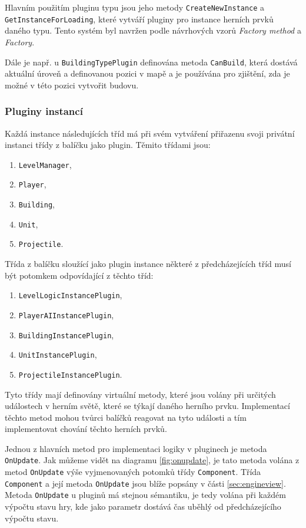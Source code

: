 Hlavním použitím pluginu typu jsou jeho metody \texttt{CreateNewInstance} a \texttt{GetInstanceForLoading}, které vytváří pluginy pro instance herních prvků daného typu. Tento systém byl navržen podle návrhových vzorů \textit{Factory method} a \textit{Factory}.

Dále je např. u \texttt{BuildingTypePlugin} definována metoda \texttt{CanBuild}, která dostává aktuální úroveň a definovanou pozici v mapě a je používána pro zjištění, zda je možné v této pozici vytvořit budovu.

\subsubsection{Pluginy instancí}
Každá instance následujících tříd má při svém vytváření přiřazenu svoji privátní instanci třídy z balíčku jako plugin. Těmito třídami jsou:
\begin{enumerate}
	\item\texttt{LevelManager}, 
	\item\texttt{Player}, 
	\item\texttt{Building},
	\item\texttt{Unit},
	\item\texttt{Projectile}.
\end{enumerate}
   
Třída z balíčku sloužící jako plugin instance některé z předcházejících tříd musí být potomkem odpovídající z těchto tříd:

\begin{enumerate}
	\item\texttt{LevelLogicInstancePlugin}, 
	\item\texttt{PlayerAIInstancePlugin}, 
	\item\texttt{BuildingInstancePlugin}, 
	\item\texttt{UnitInstancePlugin}, 
	\item\texttt{ProjectileInstancePlugin}.
\end{enumerate}

Tyto třídy mají definovány virtuální metody, které jsou volány při určitých událostech v herním světě, které se týkají daného herního prvku. Implementací těchto metod mohou tvůrci balíčků reagovat na tyto události a tím implementovat chování těchto herních prvků.

Jednou z hlavních metod pro implementaci logiky v pluginech je metoda \texttt{OnUpdate}. Jak můžeme vidět na diagramu \ref{fig:onupdate}, je tato metoda volána z metod \texttt{OnUpdate} výše vyjmenovaných potomků třídy \texttt{Component}. Třída \texttt{Component} a její metoda \texttt{OnUpdate} jsou blíže popsány v části \ref{sec:engineview}. Metoda \texttt{OnUpdate} u pluginů má stejnou sémantiku, je tedy volána při každém výpočtu stavu hry, kde jako parametr dostává čas uběhlý od předcházejícího výpočtu stavu.

